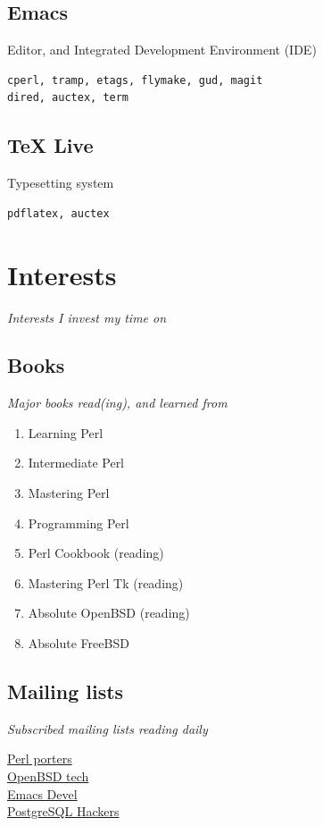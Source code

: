 \documentclass {article}
\begin{document}
    \subsection{Emacs}
    Editor, and Integrated Development Environment (IDE)
      \begin{verbatim}
cperl, tramp, etags, flymake, gud, magit
dired, auctex, term
   \end{verbatim}

    \subsection{TeX Live}
    Typesetting system
      \begin{verbatim}
pdflatex, auctex
   \end{verbatim}

  \section{Interests}
  \textit{Interests I invest my time on}

    \subsection{Books}
      \textit{Major books read(ing), and learned from}
      \begin{enumerate}
        \item{Learning Perl\cite{learning_perl}}
        \item{Intermediate Perl\cite{intermediate_perl}}
        \item{Mastering Perl\cite{mastering_perl}}
        \item{Programming Perl\cite{programming_perl}}
        \item{Perl Cookbook\cite{perl_cookbook}} (reading)
        \item{Mastering Perl Tk\cite{perl_tk}} (reading)
        \item{Absolute OpenBSD\cite{absolute_openbsd}} (reading)
        \item{Absolute FreeBSD\cite{absolute_freebsd}}
      \end{enumerate}

    \subsection{Mailing lists}
      \textit{Subscribed mailing lists reading daily}
      \begin{description}
        \item[\href{https://lists.perl.org/list/perl5-porters.html}{Perl porters}]
        \item[\href{https://www.openbsd.org/mail.html}{OpenBSD tech}]
        \item[\href{https://lists.gnu.org/mailman/listinfo/emacs-devel}{Emacs Devel}]
        \item[\href{https://www.postgresql.org/list/pgsql-hackers/}{PostgreSQL Hackers}]
      \end{description}
\end{document}
